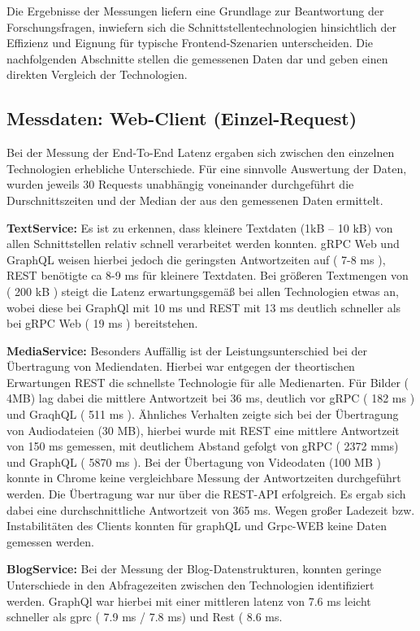 Die Ergebnisse der Messungen liefern eine Grundlage zur Beantwortung der Forschungsfragen, inwiefern sich die Schnittstellentechnologien hinsichtlich der Effizienz und Eignung für typische Frontend-Szenarien unterscheiden.  
Die nachfolgenden Abschnitte stellen die gemessenen Daten dar und geben einen direkten Vergleich der Technologien.

\clearpage
\subsection*{Messdaten: Web-Client (Einzel-Request)}

Bei der Messung der End-To-End Latenz ergaben sich zwischen den einzelnen Technologien erhebliche Unterschiede. 
Für eine sinnvolle Auswertung der Daten, wurden jeweils 30 Requests unabhängig voneinander durchgeführt die Durschnittszeiten und der Median der aus den gemessenen Daten ermittelt. 


\textbf{TextService:}  
Es ist zu erkennen, dass kleinere Textdaten (1kB – 10 kB) von allen Schnittstellen relativ schnell verarbeitet werden konnten. gRPC Web und GraphQL weisen hierbei jedoch die geringsten Antwortzeiten auf ( 7-8 ms ), REST benötigte ca 8-9 ms für kleinere Textdaten. Bei größeren Textmengen von ( 200 kB ) steigt die Latenz erwartungsgemäß bei allen Technologien etwas an, wobei diese bei GraphQl mit 10 ms und REST mit 13 ms deutlich schneller als bei gRPC Web ( 19 ms ) bereitstehen. 

\textbf{MediaService:}  
Besonders Auffällig ist der Leistungsunterschied bei der Übertragung von Mediendaten.
Hierbei war entgegen der theortischen Erwartungen REST die schnellste Technologie für alle Medienarten. Für Bilder ( 4MB) lag dabei die mittlere Antwortzeit bei 36 ms, deutlich vor gRPC ( 182 ms ) und GraqhQL ( 511 ms ).
Ähnliches Verhalten zeigte sich bei der Übertragung von Audiodateien (30 MB), hierbei wurde mit REST eine mittlere Antwortzeit von 150 ms gemessen, mit deutlichem Abstand gefolgt von gRPC ( 2372 mms) und GraphQL ( 5870  ms ).
Bei der Übertagung von Videodaten (100 MB ) konnte in Chrome keine vergleichbare Messung der Antwortzeiten durchgeführt werden. Die Übertragung war nur über die REST-API erfolgreich. Es ergab sich dabei eine durchschnittliche Antwortzeit von 365 ms. Wegen großer Ladezeit bzw. Instabilitäten des Clients konnten für graphQL und Grpc-WEB keine Daten gemessen werden. 


\textbf{BlogService:}  
Bei der Messung der Blog-Datenstrukturen, konnten geringe Unterschiede in den Abfragezeiten zwischen den Technologien identifiziert werden. GraphQl war hierbei mit einer mittleren latenz von 7.6 ms leicht schneller als gprc ( 7.9 ms / 7.8 ms) und Rest ( 8.6 ms.

